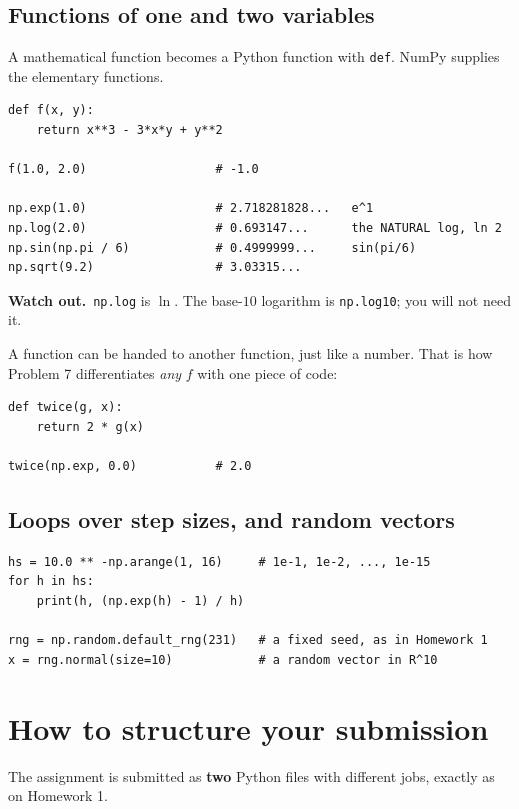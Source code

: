 \documentclass[11pt]{article}
\newcommand{\heads}[1]{\par\smallskip\noindent
  {\small\sffamily\textcolor{BrickRed}{\textbf{Watch out.}}\ #1}\par\smallskip}
\begin{document}
\subsection{Functions of one and two variables}

A mathematical function becomes a Python function with \texttt{def}. NumPy
supplies the elementary functions.

\begin{lstlisting}
def f(x, y):
    return x**3 - 3*x*y + y**2

f(1.0, 2.0)                  # -1.0

np.exp(1.0)                  # 2.718281828...   e^1
np.log(2.0)                  # 0.693147...      the NATURAL log, ln 2
np.sin(np.pi / 6)            # 0.4999999...     sin(pi/6)
np.sqrt(9.2)                 # 3.03315...
\end{lstlisting}

\heads{\texttt{np.log} is $\ln$. The base-$10$ logarithm is \texttt{np.log10};
you will not need it.}

\noindent A function can be handed to another function, just like a number. That
is how Problem 7 differentiates \emph{any} $f$ with one piece of code:

\begin{lstlisting}
def twice(g, x):
    return 2 * g(x)

twice(np.exp, 0.0)           # 2.0
\end{lstlisting}

\subsection{Loops over step sizes, and random vectors}

\begin{lstlisting}
hs = 10.0 ** -np.arange(1, 16)     # 1e-1, 1e-2, ..., 1e-15
for h in hs:
    print(h, (np.exp(h) - 1) / h)

rng = np.random.default_rng(231)   # a fixed seed, as in Homework 1
x = rng.normal(size=10)            # a random vector in R^10
\end{lstlisting}

\section{How to structure your submission}
The assignment is submitted as \textbf{two} Python files with different jobs,
exactly as on Homework 1.
\end{document}
